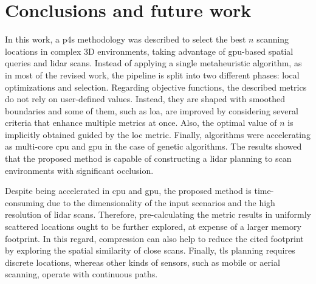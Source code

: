 \section{Conclusions and future work}

In this work, a \acrshort{p4s} methodology was described to select the best $n$ scanning locations in complex 3D environments, taking advantage of \acrshort{gpu}-based spatial queries and \acrshort{lidar} scans. Instead of applying a single metaheuristic algorithm, as in most of the revised work, the pipeline is split into two different phases: local optimizations and selection. Regarding objective functions, the described metrics do not rely on user-defined values. Instead, they are shaped with smoothed boundaries and some of them, such as \acrshort{loa}, are improved by considering several criteria that enhance multiple metrics at once. Also, the optimal value of $n$ is implicitly obtained guided by the \acrshort{loc} metric. Finally, algorithms were accelerating as multi-core \acrshort{cpu} and \acrshort{gpu} in the case of genetic algorithms. The results showed that the proposed method is capable of constructing a \acrshort{lidar} planning to scan environments with significant occlusion.

Despite being accelerated in \acrshort{cpu} and \acrshort{gpu}, the proposed method is time-consuming due to the dimensionality of the input scenarios and the high resolution of \acrshort{lidar} scans. Therefore, pre-calculating the metric results in uniformly scattered locations ought to be further explored, at expense of a larger memory footprint. In this regard, compression can also help to reduce the cited footprint by exploring the spatial similarity of close scans. Finally, \acrshort{tls} planning requires discrete locations, whereas other kinds of sensors, such as mobile or aerial scanning, operate with continuous paths.  
